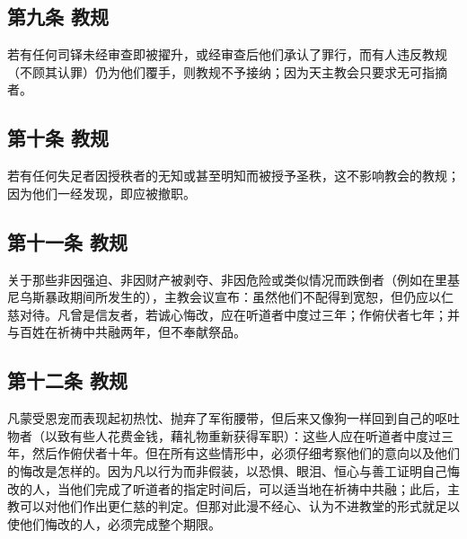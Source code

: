 
\subsection{第九条 教规}

若有任何司铎未经审查即被擢升，或经审查后他们承认了罪行，而有人违反教规（不顾其认罪）仍为他们覆手，则教规不予接纳；因为天主教会只要求无可指摘者。\par


\subsection{第十条 教规}

若有任何失足者因授秩者的无知或甚至明知而被授予圣秩，这不影响教会的教规；因为他们一经发现，即应被撤职。\par


\subsection{第十一条 教规}

关于那些非因强迫、非因财产被剥夺、非因危险或类似情况而跌倒者（例如在里基尼乌斯暴政期间所发生的），主教会议宣布：虽然他们不配得到宽恕，但仍应以仁慈对待。凡曾是信友者，若诚心悔改，应在听道者中度过三年；作俯伏者七年；并与百姓在祈祷中共融两年，但不奉献祭品。\par


\subsection{第十二条 教规}

凡蒙受恩宠而表现起初热忱、抛弃了军衔腰带，但后来又像狗一样回到自己的呕吐物者（以致有些人花费金钱，藉礼物重新获得军职）：这些人应在听道者中度过三年，然后作俯伏者十年。但在所有这些情形中，必须仔细考察他们的意向以及他们的悔改是怎样的。因为凡以行为而非假装，以恐惧、眼泪、恒心与善工证明自己悔改的人，当他们完成了听道者的指定时间后，可以适当地在祈祷中共融；此后，主教可以对他们作出更仁慈的判定。但那对此漫不经心、认为不进教堂的形式就足以使他们悔改的人，必须完成整个期限。\par

